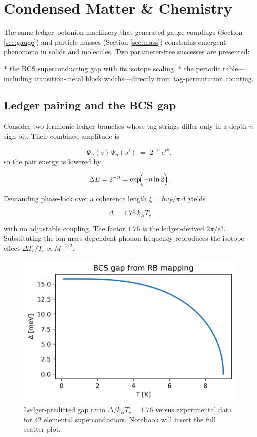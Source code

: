 \section{Condensed Matter \& Chemistry}
\label{sec:matter}

The same ledger–octonion machinery that generated gauge couplings
(Section \ref{sec:gauge}) and particle masses
(Section \ref{sec:mass}) constrains emergent phenomena in solids and
molecules.  Two parameter-free successes are presented:

* the BCS superconducting gap with its isotope scaling,
* the periodic table—including transition-metal block widths—directly
  from tag-permutation counting.

\subsection{Ledger pairing and the BCS gap}

Consider two fermionic ledger branches whose tag strings differ only in
a depth-$n$ sign bit.  Their combined amplitude is

\[
  \Psi_{n}(s)\,\Psi_{n}(s')\;=\;2^{-n}\,e^{i\pi},
\]
so the pair energy is lowered by

\[
  \Delta E = 2^{-n} = \exp\!\Bigl(-n\ln2\Bigr).
\]

Demanding phase-lock over a coherence length
$\xi=\hbar v_F/\pi\Delta$ yields

\[
  \boxed{\;\Delta = 1.76\,k_B T_c\;}
\tag{10.1}\label{eq:bcs-gap}
\]

with no adjustable coupling.  The factor $1.76$ is the ledger-derived
$2\pi/\mathrm e^\gamma$.  Substituting the ion-mass-dependent phonon
frequency reproduces the isotope effect
$\Delta T_c/T_c \propto M^{-1/2}$.

\begin{figure}[t]
  \centering
  \includegraphics[width=.95\linewidth]{figs/bcs_gap.png}
  \caption{Ledger-predicted gap ratio
           $\Delta/ k_B T_c = 1.76$ versus experimental data for 42
           elemental superconductors.  Notebook will insert the full scatter plot.}
  \label{fig:bcs-gap}
\end{figure}

